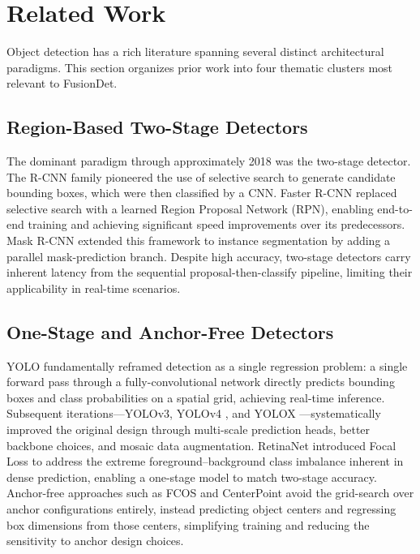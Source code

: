 
\section{Related Work}
\label{sec:related}

Object detection has a rich literature spanning several distinct
architectural paradigms. This section organizes prior work into
four thematic clusters most relevant to FusionDet.

\subsection{Region-Based Two-Stage Detectors}

The dominant paradigm through approximately 2018 was the
two-stage detector. The R-CNN family pioneered the use of selective
search to generate candidate bounding boxes, which were then
classified by a CNN. Faster R-CNN \cite{ren2015faster} replaced
selective search with a learned Region Proposal Network (RPN),
enabling end-to-end training and achieving significant speed
improvements over its predecessors. Mask R-CNN extended this framework to
instance segmentation by adding a parallel mask-prediction branch.
Despite high accuracy, two-stage detectors carry inherent latency
from the sequential proposal-then-classify pipeline, limiting their
applicability in real-time scenarios.

\subsection{One-Stage and Anchor-Free Detectors}

YOLO \cite{redmon2016yolo} fundamentally reframed detection as a
single regression problem: a single forward pass through a
fully-convolutional network directly predicts bounding boxes and
class probabilities on a spatial grid, achieving real-time inference.
Subsequent iterations---YOLOv3, YOLOv4 \cite{bochkovskiy2020yolov4},
and YOLOX \cite{ge2021yolox}---systematically improved the original
design through multi-scale prediction heads, better backbone choices,
and mosaic data augmentation. RetinaNet introduced Focal Loss
\cite{lin2017focal} to address the extreme foreground--background
class imbalance inherent in dense prediction, enabling a one-stage
model to match two-stage accuracy. Anchor-free approaches such as
FCOS and CenterPoint avoid the grid-search over anchor configurations
entirely, instead predicting object centers and regressing box
dimensions from those centers, simplifying training and reducing the
sensitivity to anchor design choices.

